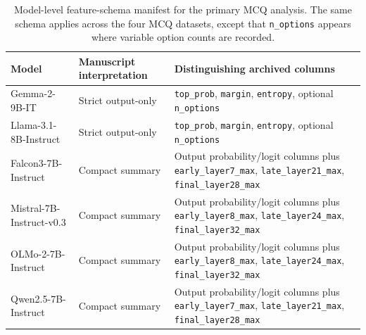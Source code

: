\begin{table}[H]
\centering
\small
\caption{Model-level feature-schema manifest for the primary MCQ analysis. The same schema applies across the four MCQ datasets, except that \texttt{n\_options} appears where variable option counts are recorded.}
\label{tab:feature-schema-manifest}
\begin{tabularx}{\textwidth}{p{}p{}X}
\toprule
Model & Manuscript interpretation & Distinguishing archived columns \\
\midrule
Gemma-2-9B-IT & Strict output-only & \texttt{top\_prob}, \texttt{margin}, \texttt{entropy}, optional \texttt{n\_options} \\
Llama-3.1-8B-Instruct & Strict output-only & \texttt{top\_prob}, \texttt{margin}, \texttt{entropy}, optional \texttt{n\_options} \\
Falcon3-7B-Instruct & Compact summary & Output probability/logit columns plus \texttt{early\_layer7\_max}, \texttt{late\_layer21\_max}, \texttt{final\_layer28\_max} \\
Mistral-7B-Instruct-v0.3 & Compact summary & Output probability/logit columns plus \texttt{early\_layer8\_max}, \texttt{late\_layer24\_max}, \texttt{final\_layer32\_max} \\
OLMo-2-7B-Instruct & Compact summary & Output probability/logit columns plus \texttt{early\_layer8\_max}, \texttt{late\_layer24\_max}, \texttt{final\_layer32\_max} \\
Qwen2.5-7B-Instruct & Compact summary & Output probability/logit columns plus \texttt{early\_layer7\_max}, \texttt{late\_layer21\_max}, \texttt{final\_layer28\_max} \\
\bottomrule
\end{tabularx}
\end{table}
